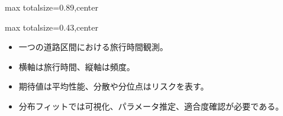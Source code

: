 \begin{minipage}[t]{0.58\textwidth}
\begin{adjustbox}{max totalsize={\textwidth}{0.89\textheight},center}
\begin{minipage}{\textwidth}
\end{minipage}
\end{adjustbox}
\end{minipage}


\clearpage
{}
\begin{minipage}[t]{0.405\textwidth}
\begin{adjustbox}{max totalsize={\textwidth}{0.43\textheight},center}
\begin{minipage}{\textwidth}\scriptsize
{}\begin{itemize}
\item 一つの道路区間における旅行時間観測。
\item 横軸は旅行時間、縦軸は頻度。
\end{itemize}\begin{itemize}
\item 期待値は平均性能、分散や分位点はリスクを表す。
\item 分布フィットでは可視化、パラメータ推定、適合度確認が必要である。
\end{itemize}
\end{minipage}
\end{adjustbox}
\end{minipage}\hfill
